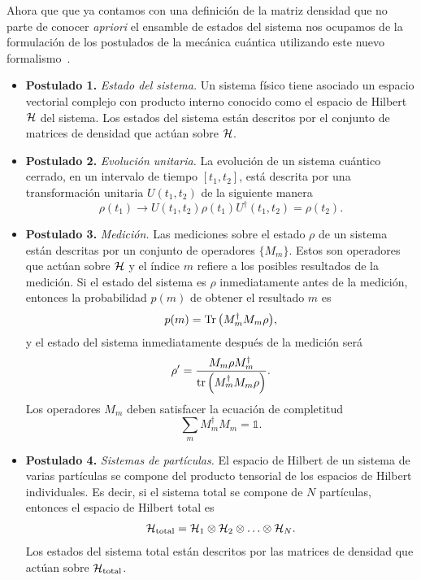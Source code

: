 Ahora que que ya contamos con una definición de la matriz densidad 
que no parte de conocer \textit{apriori} el ensamble de estados del sistema
nos ocupamos de la formulación de los postulados de la mecánica cuántica 
utilizando este nuevo formalismo~\cite[p.~102]{nielsen_chuang_2011}.
\begin{itemize}
	\item[] \textbf{Postulado 1.} \textit{Estado del sistema.} 
	Un sistema físico tiene asociado un espacio vectorial complejo
	con producto interno conocido como el espacio de Hilbert $\mathcal{H}$ del
	sistema. Los estados del sistema están descritos por el conjunto 
	de matrices de densidad que actúan sobre $\mathcal{H}$.
	\item[] \textbf{Postulado 2.} \textit{Evolución unitaria.}
	La evolución de un sistema cuántico cerrado, en un intervalo 
	de tiempo $[t_1,t_2]$, está descrita por una transformación unitaria $U(t_1,t_2)$
	de la siguiente manera 
	\begin{equation} \label{eq:postulate-ClosedEvolution}
	\rho(t_1)\longrightarrow U(t_1,t_2)\rho(t_1) U^{\dagger}(t_1,t_2)=\rho(t_2).
	\end{equation}
	\item[] \textbf{Postulado 3.} \textit{Medición.}
	Las mediciones sobre el estado $\rho$ de un sistema 
	están descritas por un conjunto de operadores $\{M_m\}$. 
	Estos son operadores que actúan sobre $\mathcal{H}$ y el 
	índice $m$ refiere a los posibles
	resultados de la medición. Si el estado del sistema es $\rho$ 
	inmediatamente antes de la medición, entonces la probabilidad
	$p(m)$ de obtener el resultado $m$ es
	\begin{equation} \label{eq:post_MeasureProb}
	p(m)=\Tr \qty(M_m^{\dagger}M_m\rho),
	\end{equation}						
	y el estado del sistema inmediatamente después de la medición será
	\begin{equation} \label{eq:post_MeasureTrasnfState}
	\rho'=\frac{M_m\rho M_m^{\dagger}}{\tr \qty(M_m^{\dagger}M_m\rho)}.
	\end{equation}	
	Los operadores $M_m$ deben satisfacer la ecuación de completitud
	\begin{equation} \label{eq:post_MeasureMCompleteness}
	\sum _m M_m^{\dagger}M_m=\mathbb{1}.
	\end{equation}
	\item[] \textbf{Postulado 4.} \textit{Sistemas de partículas.}
	El espacio de Hilbert de un sistema 	de varias partículas se compone del
	producto tensorial de los espacios de Hilbert 	individuales.
	Es decir, si el sistema total se compone de $N$ partículas, 
	entonces el espacio de Hilbert total es
	\begin{align}\label{eq:postulado4}
		\mathcal{H}_{\text{total}} = \mathcal{H}_1\otimes \mathcal{H}_2 \otimes \ldots \otimes \mathcal{H}_N.
	\end{align}
	Los estados del sistema total están descritos por las matrices de 
	densidad que actúan sobre $\mathcal{H} _{\text{total}}$.
\end{itemize}
